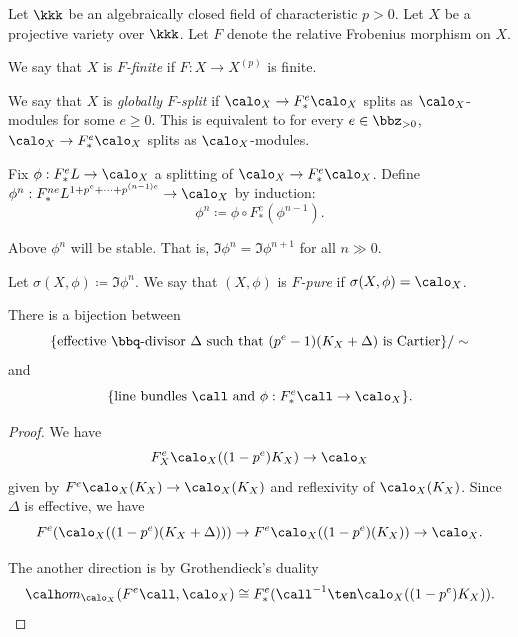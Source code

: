 Let \(\kkk\) be an algebraically closed field of characteristic \(p > 0\).
    Let \(X\) be a projective variety over \(\kkk\).
    Let \(F\) denote the relative Frobenius morphism on \(X\).


    \begin{definition}
        We say that \(X\) is \emph{\(F\)-finite} if \(F: X \to X^{(p)}\) is finite.
    \end{definition}

    \begin{definition}
        We say that \(X\) is \emph{globally \(F\)-split} if \(\calo_X \to F_*^e\calo_X\) splits as \(\calo_X\)-modules for some \(e \geq 0\).
        This is equivalent to for every \(e \in \bbz_{> 0}\), \(\calo_X \to F_*^e\calo_X\) splits as \(\calo_X\)-modules.
    \end{definition}

    \begin{definition}
        Fix \(\phi: F_*^eL \to \calo_X\) a splitting of \(\calo_X \to F_*^e\calo_X\).
        Define \(\phi^n: F_*^{ne}L^{1+p^e + \cdots + p^{(n-1)e}} \to \calo_X\) by induction:
        \[ \phi^{n} \coloneqq \phi \circ F_*^e(\phi^{n-1}). \]
    \end{definition}

    \begin{theorem}
        Above \(\phi^n\) will be stable.
        That is, \(\Im \phi^n = \Im \phi^{n+1}\) for all \(n \gg 0\).
    \end{theorem}

    \begin{definition}
        Let \(\sigma(X,\phi) \coloneqq \Im \phi^n\). 
        We say that \((X,\phi)\) is \emph{\(F\)-pure} if \(\sigma(X,\phi) = \calo_X\).
    \end{definition}

    \begin{proposition}
        There is a bijection between 
        \[ \{\text{effective } \bbq \text{-divisor } \Delta \text{ such that } (p^e-1)(K_X + \Delta) \text{ is Cartier} \}/\sim \]
        and 
        \[ \{ \text{line bundles } \call \text{ and } \phi: F_*^e \call \to \calo_X \} . \]
    \end{proposition}
    \begin{proof}
        We have 
        \[ F_X^e\calo_X((1-p^e)K_X) \to \calo_X \]
        given by \(F^e\calo_X(K_X) \to \calo_X(K_X)\) and reflexivity of \(\calo_X(K_X)\).
        Since \(\Delta\) is effective, we have 
        \[ F^e(\calo_X((1-p^e)(K_X + \Delta))) \to F^e\calo_X((1-p^e)(K_X)) \to \calo_X. \]

        The another direction is by Grothendieck's duality 
        \[ \calh om_{\calo_X}(F^e\call, \calo_X) \cong F_*^e(\call^{-1}\ten\calo_X((1-p^e)K_X)). \]
    \end{proof}

